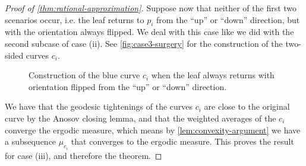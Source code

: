 \documentclass[12pt, reqno]{amsart}
\begin{document}
\begin{proof}[Proof of \autoref{thm:rational-approximation}]
  Suppose now that neither of the first two scenarios occur, i.e. the leaf returns to $p_i$ from the ``up'' or ``down'' direction, but with the orientation always flipped.
  We deal with this case like we did with the second subcase of case (ii).
  See \autoref{fig:case3-surgery} for the construction of the two-sided curves $c_i$.
  \begin{figure}[h]
    \centering
    \caption{Construction of the blue curve $c_i$ when the leaf always returns with orientation flipped from the ``up'' or ``down'' direction.}
    \label{fig:case3-surgery}
  \end{figure}
  We have that the geodesic tightenings of the curves $c_i$ are close to the original curve by the Anosov closing lemma, and that the weighted averages of the $c_i$ converge the ergodic measure, which means by \autoref{lem:convexity-argument} we have a subsequence $\mu_{c_i}$ that converges to the ergodic measure.
  This proves the result for case (iii), and therefore the theorem.
\end{proof}

\end{document}
